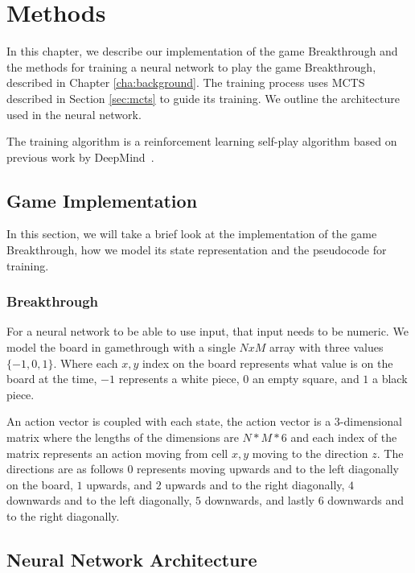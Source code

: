 \chapter{Methods\label{cha:methods}}

In this chapter, we describe our implementation of the game Breakthrough and the methods for training a neural network to play the game Breakthrough, described in Chapter \ref{cha:background}. The training process uses MCTS described in Section \ref{sec:mcts} to guide its training. We outline the architecture used in the neural network.

The training algorithm is a reinforcement learning self-play algorithm based on previous work by DeepMind~\cite{silver:alphagozero}.

\section{Game Implementation}

In this section, we will take a brief look at the implementation of the game Breakthrough, how we model its state representation and the pseudocode for training.

\subsection{Breakthrough}

For a neural network to be able to use input, that input needs to be numeric. We model the board in gamethrough with a single $NxM$ array with three values $\{-1,0,1\}$. Where each $x,y$ index on the board represents what value is on the board at the time, $-1$ represents a white piece, $0$ an empty square, and $1$ a black piece.

An action vector is coupled with each state, the action vector is a $3$-dimensional matrix where the lengths of the dimensions are $N * M * 6$ and each index of the matrix represents an action moving from cell $x,y$ moving to the direction $z$. The directions are as follows $0$ represents moving upwards and to the left diagonally on the board, $1$ upwards, and $2$ upwards and to the right diagonally, $4$ downwards and to the left diagonally, $5$ downwards, and lastly $6$ downwards and to the right diagonally.

\section{Neural Network Architecture}

